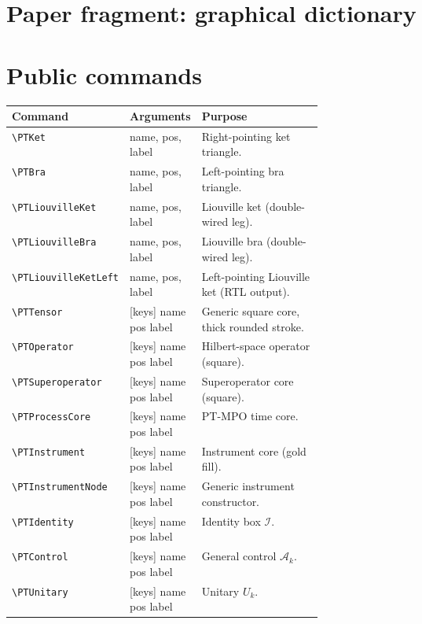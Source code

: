 \documentclass[11pt,a4paper]{article}
\begin{document}
\vspace{1.6em}
\section*{Paper fragment: graphical dictionary}

\vspace{2em}
\section*{Public commands}
\small
\begin{tabular}{@{}llp{0.46\linewidth}@{}}
\toprule
Command & Arguments & Purpose \\
\midrule
\verb|\PTKet| & name, pos, label & Right-pointing ket triangle. \\
\verb|\PTBra| & name, pos, label & Left-pointing bra triangle. \\
\verb|\PTLiouvilleKet| & name, pos, label & Liouville ket (double-wired leg). \\
\verb|\PTLiouvilleBra| & name, pos, label & Liouville bra (double-wired leg). \\
\verb|\PTLiouvilleKetLeft| & name, pos, label & Left-pointing Liouville ket (RTL output). \\
\verb|\PTTensor| & [keys] name pos label & Generic square core, thick rounded stroke. \\
\verb|\PTOperator| & [keys] name pos label & Hilbert-space operator (square). \\
\verb|\PTSuperoperator| & [keys] name pos label & Superoperator core (square). \\
\verb|\PTProcessCore| & [keys] name pos label & PT-MPO time core. \\
\verb|\PTInstrument| & [keys] name pos label & Instrument core (gold fill). \\
\verb|\PTInstrumentNode| & [keys] name pos label & Generic instrument constructor. \\
\verb|\PTIdentity| & [keys] name pos label & Identity box \(\mathcal I\). \\
\verb|\PTControl| & [keys] name pos label & General control \(\mathcal A_k\). \\
\verb|\PTUnitary| & [keys] name pos label & Unitary \(U_k\). \\

\end{tabular}
\end{document}
